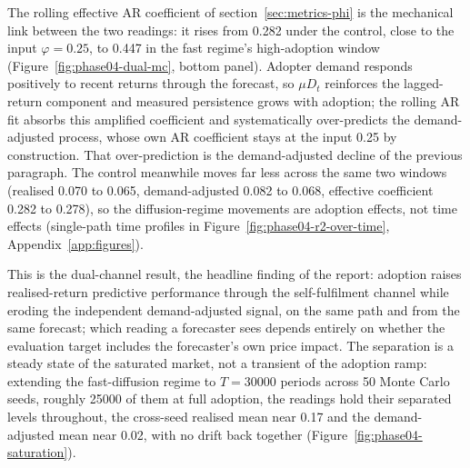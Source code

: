 \documentclass[12pt]{article}
\begin{document}
The rolling effective AR coefficient of section~\ref{sec:metrics-phi} is the mechanical link between the two readings: it rises from 0.282 under the control, close to the input $\varphi=0.25$, to 0.447 in the fast regime's high-adoption window (Figure~\ref{fig:phase04-dual-mc}, bottom panel). %
Adopter demand responds positively to recent returns through the forecast, so $\mu D_t$ reinforces the lagged-return component and measured persistence grows with adoption; the rolling AR fit absorbs this amplified coefficient and systematically over-predicts the demand-adjusted process, whose own AR coefficient stays at the input 0.25 by construction. That over-prediction is the demand-adjusted decline of the previous paragraph. %
The control meanwhile moves far less across the same two windows (realised 0.070 to 0.065, demand-adjusted 0.082 to 0.068, effective coefficient 0.282 to 0.278), so the diffusion-regime movements are adoption effects, not time effects (single-path time profiles in Figure~\ref{fig:phase04-r2-over-time}, Appendix~\ref{app:figures}). %

This is the dual-channel result, the headline finding of the report: adoption raises realised-return predictive performance through the self-fulfilment channel while eroding the independent demand-adjusted signal, on the same path and from the same forecast; which reading a forecaster sees depends entirely on whether the evaluation target includes the forecaster's own price impact.
The separation is a steady state of the saturated market, not a transient of the adoption ramp: extending the fast-diffusion regime to $T=30000$ periods across 50 Monte Carlo seeds, roughly 25000 of them at full adoption, the readings hold their separated levels throughout, the cross-seed realised mean near 0.17 and the demand-adjusted mean near 0.02, with no drift back together (Figure~\ref{fig:phase04-saturation}). %
\end{document}
